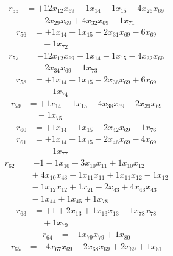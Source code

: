 \[\begin{aligned}
r_{55} &= + 12 x_{12} x_{69} + 1 x_{14} - 1 x_{15} - 4 x_{26} x_{69} \\
 &\quad - 2 x_{29} x_{69} + 4 x_{32} x_{69} - 1 x_{71}
\end{aligned}\]
\[\begin{aligned}
r_{56} &= + 1 x_{14} - 1 x_{15} - 2 x_{31} x_{69} - 6 x_{69} \\
 &\quad - 1 x_{72}
\end{aligned}\]
\[\begin{aligned}
r_{57} &= - 12 x_{12} x_{69} + 1 x_{14} - 1 x_{15} - 4 x_{32} x_{69} \\
 &\quad - 2 x_{34} x_{69} - 1 x_{73}
\end{aligned}\]
\[\begin{aligned}
r_{58} &= + 1 x_{14} - 1 x_{15} - 2 x_{36} x_{69} + 6 x_{69} \\
 &\quad - 1 x_{74}
\end{aligned}\]
\[\begin{aligned}
r_{59} &= + 1 x_{14} - 1 x_{15} - 4 x_{38} x_{69} - 2 x_{39} x_{69} \\
 &\quad - 1 x_{75}
\end{aligned}\]
\[\begin{aligned}
r_{60} &= + 1 x_{14} - 1 x_{15} - 2 x_{42} x_{69} - 1 x_{76}
\end{aligned}\]
\[\begin{aligned}
r_{61} &= + 1 x_{14} - 1 x_{15} - 2 x_{46} x_{69} - 4 x_{69} \\
 &\quad - 1 x_{77}
\end{aligned}\]
\[\begin{aligned}
r_{62} &= - 1 - 1 x_{10} - 3 x_{10} x_{11} + 1 x_{10} x_{12} \\
 &\quad + 4 x_{10} x_{43} - 1 x_{11} x_{11} + 1 x_{11} x_{12} - 1 x_{12} \\
 &\quad - 1 x_{12} x_{12} + 1 x_{21} - 2 x_{43} + 4 x_{43} x_{43} \\
 &\quad - 1 x_{44} + 1 x_{45} + 1 x_{78}
\end{aligned}\]
\[\begin{aligned}
r_{63} &= + 1 + 2 x_{13} + 1 x_{13} x_{13} - 1 x_{78} x_{78} \\
 &\quad + 1 x_{79}
\end{aligned}\]
\[\begin{aligned}
r_{64} &= - 1 x_{79} x_{79} + 1 x_{80}
\end{aligned}\]
\[\begin{aligned}
r_{65} &= - 4 x_{67} x_{69} - 2 x_{68} x_{69} + 2 x_{69} + 1 x_{81}
\end{aligned}\]
